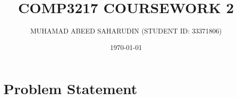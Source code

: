 \documentclass[12pt]{article}
\title{COMP3217 COURSEWORK 2}
\author{MUHAMAD ABEED SAHARUDIN (STUDENT ID: 33371806)}
\date{\today}
\begin{document}
\maketitle

\section{Problem Statement}
\end{document}
